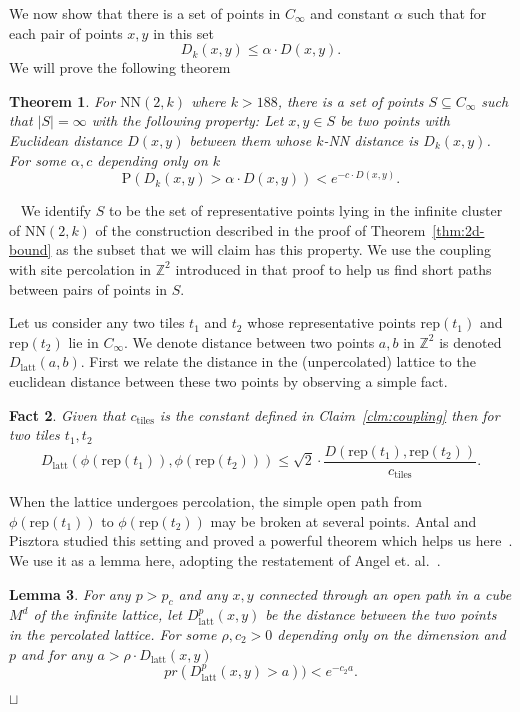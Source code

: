 \documentclass[11pt]{article}
\newtheorem{theorem}{Theorem}[section]
\newtheorem{lemma}[theorem]{Lemma}
\newtheorem{fact}[theorem]{Fact}
\newcommand{\sq}{\hbox{\rlap{$\sqcap$}$\sqcup$}}
\newcommand{\qed}{\hspace*{\fill}\sq}
\newenvironment{proof}{\noindent {\bf Proof.}\ }{\qed\par\vskip 4mm\par}
\def\rep{\mbox{rep}}
\def\ZZ{\mathbb{Z}}
\def\NN{\mbox{NN}}
\def\pr{\mbox{P}}
\def\tiles{\mbox{tiles}}
\def\latt{\mbox{latt}}
\begin{document}
We now show that there is a set of points in $C_\infty$ and constant
$\alpha$ such that for each pair of points $x,y$ in this set
\[ D_k(x,y) \leq \alpha \cdot D(x,y).\]
We will prove the following theorem
\begin{theorem}
\label{thm:metric}
For $\NN(2,k)$ where $k > 188$, there is a set of points $S
\subseteq C_\infty$ such that $|S| = \infty$ with the following
property: Let $x,y \in S$ be two points with Euclidean distance
$D(x,y)$ between them whose $k$-NN distance is $D_k(x,y)$. For some
$\alpha, c$ depending only on $k$
\[\pr(D_k(x,y) > \alpha \cdot D(x,y)) < e^{-c \cdot D(x,y)}.\]
\end{theorem}
\begin{proof}
We identify $S$ to be the set of representative points lying in the
infinite cluster of $\NN(2,k)$ of the construction described in the
proof of Theorem~\ref{thm:2d-bound} as the subset that we will claim
has this property. We use the coupling with site percolation in
$\ZZ^2$ introduced in that proof to help us find short paths between
pairs of points in $S$. 

Let us consider any two tiles $t_1$ and $t_2$ whose representative
points $\rep(t_1)$ and $\rep(t_2)$ lie in $C_\infty$. We denote
distance between two points $a,b$ in $\ZZ^2$ is denoted
$D_{\latt}(a,b)$. First we relate the distance in the (unpercolated)
lattice to the euclidean distance between these two points by
observing a simple fact.
\begin{fact}
\label{fct:euclidean-lattice}
Given that $c_{\tiles}$ is the constant defined in
Claim~\ref{clm:coupling} then for two tiles $t_1, t_2$
\[D_{\latt}(\phi(\rep(t_1)), \phi(\rep(t_2))) \leq \sqrt{2} \cdot
\frac{D(\rep(t_1),\rep(t_2))}{c_{\tiles}}.\]
\end{fact}

When the lattice undergoes percolation, the simple open path from
$\phi(\rep(t_1))$ to $\phi(\rep(t_2))$ may be broken at several
points. Antal and Pisztora studied this setting and proved a powerful
theorem which helps us here~\cite[Theorems 1.1 and
1.2]{antal-ap:1996}. We use it as a lemma here, adopting the
restatement of Angel et. al.~\cite[Lemma 8]{angel-podc:2005}.
\begin{lemma}
\label{lem:antal}
{\bf \cite{antal-ap:1996,angel-podc:2005}} For any $p > p_c$ and any
  $x,y$ connected through an open path in a cube $M^d$ of the infinite
  lattice, let $D^p_{\latt}(x,y)$ be the distance between the two
  points in the percolated lattice. For some $\rho, c_2 > 0$ depending
  only on the dimension and $p$ and for any $a > \rho \cdot
  D_{\latt}(x,y)$
\[pr(D^p_{\latt}(x,y) > a)) < e^{-c_2 a}.\]
\end{lemma}


\end{proof}
\end{document}
